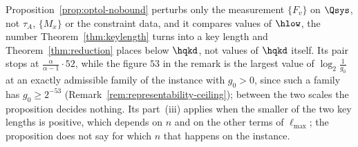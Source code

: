 
Proposition~\ref{prop:optol-nobound} perturbs only the measurement
$\{F_v\}$ on $\Qsys$, not $\tau_A$, $\{M_x\}$ or the constraint data, and
it compares values of $\hlow$, the number Theorem~\ref{thm:keylength}
turns into a key length and Theorem~\ref{thm:reduction} places below
$\hqkd$, not values of $\hqkd$ itself. Its pair stops at
$\frac{\alpha}{\alpha-1}\cdot52$, while the figure $53$ in the remark is
the largest value of $\log_2\frac1{g_0}$ at an exactly admissible family
of the instance with $g_0>0$, since such a family has $g_0\ge2^{-53}$
(Remark~\ref{rem:representability-ceiling}); between the two scales the
proposition decides nothing. Its part~(iii) applies when the smaller of
the two key lengths is positive, which depends on $n$ and on the other
terms of $\ell_{\max}$; the proposition does not say for which $n$ that
happens on the instance.

